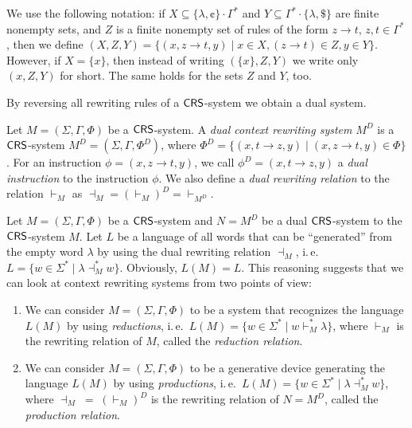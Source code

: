 \begin{remark}\label{remark:setinstructions}
We use the following notation: if $X \subseteq \{\lambda, \cent\}\cdot\Gamma^*$ and $Y \subseteq \Gamma^*\cdot\{\lambda, \$\}$ are finite nonempty sets, and $Z$ is a finite nonempty set of rules of the form $z \to t$, $z, t \in \Gamma^*$, then we define $(X, Z, Y) = \{(x, z \to t, y) \mid x \in X, (z \to t) \in Z, y \in Y \}$. However, if $X = \{ x \}$, then instead of writing $( \{ x \}, Z, Y)$ we write only $(x, Z, Y)$ for short. The same holds for the sets $Z$ and $Y$, too.
\end{remark}

By reversing all rewriting rules of a $\textup{\sf CRS\/}$-system we obtain a dual system.

\begin{definition}\label{definition:crs-dual}
Let $M=(\Sigma, \Gamma, \Phi)$ be a $\textup{\sf CRS\/}$-system. A \emph{dual context rewriting system} $M^D$ is a $\textup{\sf CRS\/}$-system $M^D = (\Sigma, \Gamma, \Phi^D)$, where $\Phi^D = \{(x, t \to z, y) \mid (x, z \to t, y) \in \Phi \}$. For an instruction $\phi = (x, z \to t, y)$, we call $\phi^D = (x, t \to z, y)$ a \emph{dual instruction} to the instruction $\phi$. We also define a \emph{dual rewriting relation} to the relation $\vdash_M$ as $\dashv_M = (\vdash_M)^D = \vdash_{M^D}$.
\end{definition}

\begin{remark}\label{remark:approach}
Let $M=(\Sigma, \Gamma, \Phi)$ be a $\textup{\sf CRS\/}$-system and $N = M^D$ be a dual $\textup{\sf CRS\/}$-system to the $\textup{\sf CRS\/}$-system $M$. Let $L$ be a language of all words that can be ``generated'' from the empty word $\lambda$ by using the dual rewriting relation $\dashv_M$, i.\,e.\ $L = \{w \in \Sigma^* \mid \lambda \dashv_M^* w\}$. Obviously, $L(M) = L$. This reasoning suggests that we can look at context rewriting systems from two points of view:
\begin{enumerate}
\item
We can consider $M=(\Sigma, \Gamma, \Phi)$ to be a system that recognizes the language $L(M)$ by using \emph{reductions}, i.\,e.\ $L(M) = \{ w \in \Sigma^* \mid w \vdash^*_M \lambda \}$, where $\vdash_M$ is the rewriting relation of $M$, called the \emph{reduction relation}.
\item
We can consider $M=(\Sigma, \Gamma, \Phi)$ to be a generative device generating the language $L(M)$ by using \emph{productions}, i.\,e.\ $L(M) = \{ w \in \Sigma^* \mid \lambda \dashv^*_M w \}$, where $\dashv_M \;= \; (\vdash_M)^D$ is the rewriting relation of $N = M^D$, called the \emph{production relation}.
\end{enumerate}
\end{remark}

